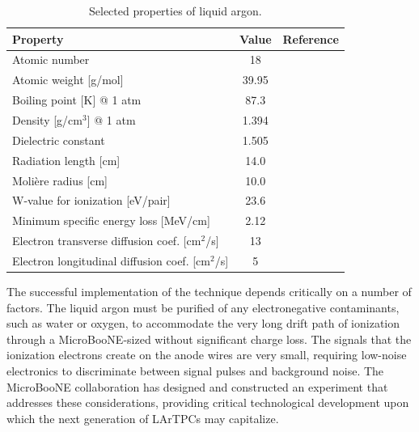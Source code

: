 \begin{table}[!htb]
   \centering
    \caption{Selected properties of liquid argon.} 
      \begin{tabular}{lcr} %
      \hline
      Property & Value & Reference\\
    \hline
   Atomic number & 18 &\\
   Atomic weight [g/mol] & 39.95 &\\
   Boiling point [K] @ 1 atm & 87.3 & \cite{ArProperties}\\
   Density [g/cm$^3$] @ 1 atm & 1.394 & \cite{ArProperties} \\
   Dielectric constant & 1.505 & \cite{DielectricPaper} \\
   Radiation length [cm] & 14.0 & \cite{Amsler20081} \\
   Moli\`{e}re radius [cm] & 10.0 &\cite{Amsler20081} \\
   W-value for ionization [eV/pair] & 23.6 & \cite{1975NucIM.131..249S,PhysRevA.9.1438} \\
   Minimum specific energy loss [MeV/cm] & 2.12 & \cite{Amsler20081} \\
   Electron transverse diffusion coef. [cm$^2$/s] & 13 & \cite{PhysRevA.20.2547,Derenzo,Cennini:1994-3ton} \\
   Electron longitudinal diffusion coef. [cm$^2$/s] & 5 & \cite{Cennini:1994-3ton, Atrazhev}\\
   \hline
   \end{tabular}

   \label{tab:nobleparam}
\end{table} 



The successful implementation of the \lartpc technique depends critically on a number of factors.   The liquid argon must be purified of any electronegative contaminants, such as water or oxygen, to accommodate the very long drift path of ionization through a MicroBooNE-sized \lartpc without significant charge loss.  The signals that the ionization electrons create on the anode wires are very small, requiring low-noise electronics to discriminate between signal pulses and background noise.  The MicroBooNE collaboration has designed and constructed an experiment that addresses these considerations, providing critical technological development upon which the next generation of LArTPCs may capitalize.  

